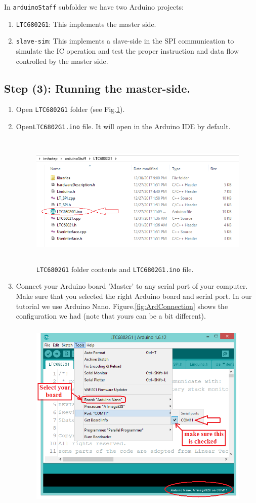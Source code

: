 In \texttt{arduinoStaff} subfolder we have two Arduino projects:
\begin{enumerate}
\item \texttt{LTC6802G1}: This implements the master side.
\item \texttt{slave-sim}: This implements a slave-side in the SPI communication to simulate the IC operation and test the proper instruction and data flow controlled by the master side.
\end{enumerate}

\subsection{Step (3): Running the master-side.}
\begin{enumerate}
    \item Open \texttt{LTC6802G1} folder (see Fig.\ref{fig:LTC6802G1folders}).
    \item Open\texttt{LTC6802G1.ino} file. It will open in the Arduino IDE by default.
        \begin{figure}[h]
        \centering
        \includegraphics[width=13.90cm,height=6.44cm]{figures/image8}
        \caption{ \texttt{LTC6802G1} folder contents and \texttt{LTC6802G1.ino} file.}
            \label{fig:LTC6802G1folders}
        \end{figure}
\item Connect your Arduino board 'Master' to any serial port of your computer. 
Make sure that you selected the right Arduino board and serial port. In our 
tutorial we use Arduino Nano. Figure.\ref{fig:ArdConnection} shows the configuration we had (note that yours can be a bit different).
    \begin{figure}[h]
    \centering
    \includegraphics[width=11.21cm,height=9.19cm]{figures/image9}

\end{figure}
\end{enumerate}

